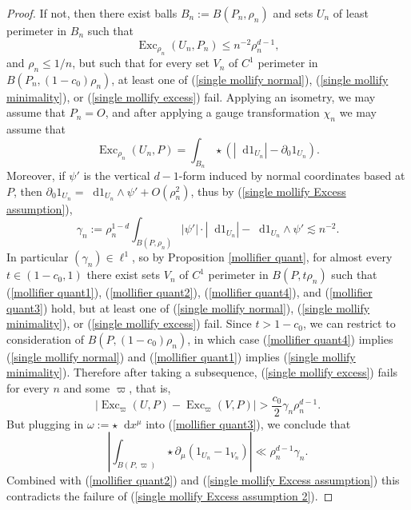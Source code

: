 \documentclass[reqno,10pt]{amsart}
\DeclareMathOperator{\Exc}{Exc}
\newcommand*\dif{\mathop{}\!\mathrm{d}}
\theoremstyle{definition}
\numberwithin{equation}{section}
\begin{document}
\begin{proof}
If not, then there exist balls $B_n := B(P_n, \rho_n)$ and sets $U_n$ of least perimeter in $B_n$ such that
\begin{equation}\label{single mollify Excess assumption}
\Exc_{\rho_n} (U_n, P_n) \leq n^{-2} \rho_n^{d - 1},
\end{equation}
and $\rho_n \leq 1/n$, but such that for every set $V_n$ of $C^1$ perimeter in $B(P_n, (1 - c_0) \rho_n)$, at least one of (\ref{single mollify normal}), (\ref{single mollify minimality}), or (\ref{single mollify excess}) fail.
Applying an isometry, we may assume that $P_n = O$, and after applying a gauge transformation $\chi_n$ we may assume that
$$\Exc_{\rho_n} (U_n, P) = \int_{B_n} \star (|\dif 1_{U_n}| - \partial_0 1_{U_n}).$$
Moreover, if $\psi'$ is the vertical $d-1$-form induced by normal coordinates based at $P$, then $\partial_0 1_{U_n} = \dif 1_{U_n} \wedge \psi' + O(\rho_n^2)$, thus by (\ref{single mollify Excess assumption}),
$$\gamma_n := \rho_n^{1 - d} \int_{B(P, \rho_n)} |\psi'| \cdot |\dif 1_{U_n}| - \dif 1_{U_n} \wedge \psi' \lesssim n^{-2}.$$
In particular $(\gamma_n) \in \ell^1$, so by Proposition \ref{mollifier quant}, for almost every $t \in (1 - c_0, 1)$ there exist sets $V_n$ of $C^1$ perimeter in $B(P, t\rho_n)$ such that (\ref{mollifier quant1}), (\ref{mollifier quant2}), (\ref{mollifier quant4}), and (\ref{mollifier quant3}) hold, but at least one of (\ref{single mollify normal}), (\ref{single mollify minimality}), or (\ref{single mollify excess}) fail.
Since $t > 1 - c_0$, we can restrict to consideration of $B(P, (1 - c_0) \rho_n)$, in which case (\ref{mollifier quant4}) implies (\ref{single mollify normal}) and (\ref{mollifier quant1}) implies (\ref{single mollify minimality}).
Therefore after taking a subsequence, (\ref{single mollify excess}) fails for every $n$ and some $\varpi$, that is,
\begin{equation}\label{single mollify Excess assumption 2}
|\Exc_\varpi (U, P) - \Exc_\varpi (V, P)| > \frac{c_0}{2} \gamma_n \rho_n^{d - 1}.
\end{equation}
But plugging in $\omega := \star \dif x^\mu$ into (\ref{mollifier quant3}), we conclude that
$$\left|\int_{B(P, \varpi)} \star \partial_\mu (1_{U_n} - 1_{V_n})\right| \ll \rho_n^{d - 1} \gamma_n.$$
Combined with (\ref{mollifier quant2}) and (\ref{single mollify Excess assumption}) this contradicts the failure of (\ref{single mollify Excess assumption 2}).
\end{proof}
\end{document}

